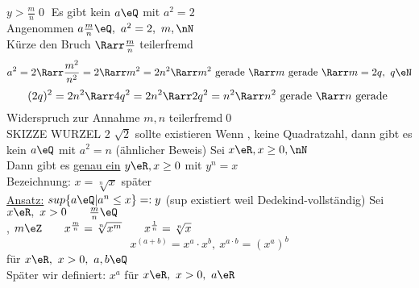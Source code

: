 $y>\frac{m}{n}$\qed
%
\Satz
Es gibt kein $a\eQ$ mit $a^2=2$\\
\bew
Angenommen $a\frac{m}{n}\eQ,\ a^2=2,\ m,\nN$\\
Kürze den Bruch $\Rarr \frac{m}{n}$ teilerfremd\\
$$a^2=2\Rarr \frac{m^2}{n^2}=2 \Rarr m^2=2n^2 \Rarr m^2 \text{ gerade } \Rarr m \text{ gerade } \Rarr m=2q,\ q\eN$$
$$(2q)^2=2n^2 \Rarr 4q^2=2n^2 \Rarr 2q^2=n^2 \Rarr  n^2 \text{ gerade } \Rarr n \text{ gerade }$$
Widerspruch zur Annahme $m,n$ teilerfremd\qed\\
SKIZZE WURZEL 2 \Rarr $\sqrt{2}$ sollte existieren %
\bem
Wenn \nN, keine Quadratzahl, dann gibt es kein $a\eQ$ mit $a^2=n$ (ähnlicher Beweis)
%
\Satz
Sei $x\eR, x\geq 0, \nN$\\
Dann gibt es \underline{genau ein} $y\eR, x\geq 0$ mit $y^n=x$\\
Bezeichnung: $x=\sqrt[n]{x}$
\bew
später\\
\underline{Ansatz:} $sup\{a\eQ|a^n\leq x\}=:y$ (sup existiert weil \R{} Dedekind-vollständig)
%
\Def
Sei $x\eR,\ x>0\qquad \frac{m}{n}\eQ$\\
\nN, $m\eZ\qquad x^{\frac{m}{n}}=\sqrt[n]{x^m}\qquad x^{\frac{1}{n}}=\sqrt[n]{x}$\\
 $$x^{(a+b)}=x^a·x^b,\ x^{a·b}=(x^a)^b$$\hfill für $x\eR,\ x>0,\ a,b\eQ$\\
\bem
Später wir definiert: $x^a$ für $x\eR,\ x>0,\ a\eR$
%
